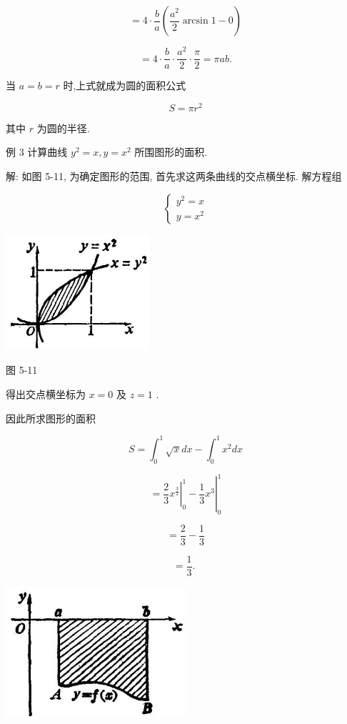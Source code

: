 \documentclass[lang=cn,newtx,12pt,scheme=chinese]{elegantbook}
\begin{document}
\[
= 4 \cdot \frac{b}{a}\left( {\frac{{a}^{2}}{2}\arcsin 1 - 0}\right)
\]

\[
= 4 \cdot \frac{b}{a} \cdot \frac{{a}^{2}}{2} \cdot \frac{\pi }{2} = {\pi ab}.
\]

当 \(a = b = r\) 时,上式就成为圆的面积公式

\[
S = \pi {r}^{2}
\]

其中 \(r\) 为圆的半径.

例 3 计算曲线 \({y}^{2} = x,y = {x}^{2}\) 所围图形的面积.

解: 如图 5-11, 为确定图形的范围, 首先求这两条曲线的交点横坐标. 解方程组

\[
\left\{ \begin{array}{l} {y}^{2} = x \\ y = {x}^{2} \end{array}\right.
\]

\begin{center}
\includegraphics[max width=0.4\textwidth]{images/01912c18-5c3f-733d-b775-749ba9897a9d_234_594804.jpg}
\end{center}

图 5-11

得出交点横坐标为 \(x = 0\) 及 \(z = 1\) .

因此所求图形的面积

\[
S = {\int }_{0}^{1}\sqrt{x}{dx} - {\int }_{0}^{1}{x}^{2}{dx}
\]

\[
= {\left. {\left. \frac{2}{3}{x}^{\frac{3}{2}}\right| }_{0}^{1} - \frac{1}{3}{x}^{3}\right| }_{0}^{1}
\]

\[
= \frac{2}{3} - \frac{1}{3}
\]

\[
= \frac{1}{3}\text{. }
\]

\begin{center}
\includegraphics[max width=0.5\textwidth]{images/01912c18-5c3f-733d-b775-749ba9897a9d_234_549966.jpg}
\end{center}
\end{document}
